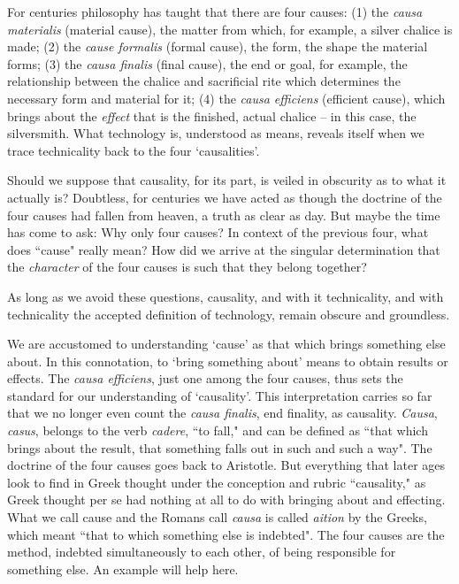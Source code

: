 \documentclass[paper=a4, fontsize=11pt,twoside]{scrartcl}
\begin{document}
For centuries philosophy has taught that there are four causes: (1) the \textit{causa materialis} (material cause), the matter from which, for example, a silver chalice is made; (2) the \textit{cause formalis} (formal cause), the form, the shape the material forms; (3) the \textit{causa finalis} (final cause), the end or goal, for example, the relationship between the chalice and sacrificial rite which determines the necessary form and material for it; (4) the \textit{causa efficiens} (efficient cause), which brings about the \textit{effect} that is the finished, actual chalice -- in this case, the silversmith. What technology is, understood as means, reveals itself when we trace technicality back to the four `causalities'.

Should we suppose that causality, for its part, is veiled in obscurity as to what it actually is? Doubtless, for centuries we have acted as though the doctrine of the four causes had fallen from heaven, a truth as clear as day. But maybe the time has come to ask: Why only four causes? In context of the previous four, what does ``cause" really mean? How did we arrive at the singular determination that the \textit{character} of the four causes is such that they belong together?

As long as we avoid these questions, causality, and with it technicality, and with technicality the accepted definition of technology, remain obscure and groundless.

We are accustomed to understanding `cause' as that which brings something else about. In this connotation, to `bring something about' means to obtain results or effects. The \textit{causa efficiens}, just one among the four causes, thus sets the standard for our understanding of `causality'. This interpretation carries so far that we no longer even count the \textit{causa finalis}, end finality, as causality. \textit{Causa}, \textit{casus}, belongs to the verb \textit{cadere}, ``to fall," and can be defined as ``that which brings about the result, that something falls out in such and such a way". The doctrine of the four causes goes back to Aristotle. But everything that later ages look to find in Greek thought under the conception and rubric ``causality," as Greek thought per se had nothing at all to do with bringing about and effecting. What we call cause and the Romans call \textit{causa} is called \textit{aition} by the Greeks, which meant ``that to which something else is indebted". The four causes are the method, indebted simultaneously to each other, of being responsible for something else. An example will help here.
\end{document}
